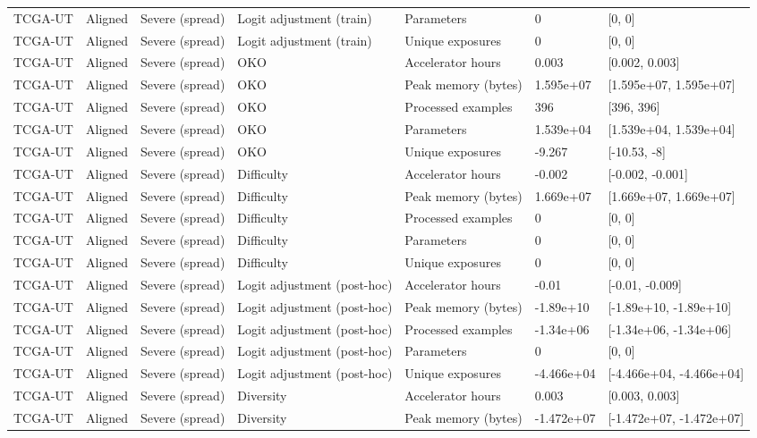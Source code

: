 \begin{longtable}{lllllll}
TCGA-UT & Aligned & Severe (spread) & Logit adjustment (train) & Parameters & 0 & [0, 0] \\
TCGA-UT & Aligned & Severe (spread) & Logit adjustment (train) & Unique exposures & 0 & [0, 0] \\
TCGA-UT & Aligned & Severe (spread) & OKO & Accelerator hours & 0.003 & [0.002, 0.003] \\
TCGA-UT & Aligned & Severe (spread) & OKO & Peak memory (bytes) & 1.595e+07 & [1.595e+07, 1.595e+07] \\
TCGA-UT & Aligned & Severe (spread) & OKO & Processed examples & 396 & [396, 396] \\
TCGA-UT & Aligned & Severe (spread) & OKO & Parameters & 1.539e+04 & [1.539e+04, 1.539e+04] \\
TCGA-UT & Aligned & Severe (spread) & OKO & Unique exposures & -9.267 & [-10.53, -8] \\
TCGA-UT & Aligned & Severe (spread) & Difficulty & Accelerator hours & -0.002 & [-0.002, -0.001] \\
TCGA-UT & Aligned & Severe (spread) & Difficulty & Peak memory (bytes) & 1.669e+07 & [1.669e+07, 1.669e+07] \\
TCGA-UT & Aligned & Severe (spread) & Difficulty & Processed examples & 0 & [0, 0] \\
TCGA-UT & Aligned & Severe (spread) & Difficulty & Parameters & 0 & [0, 0] \\
TCGA-UT & Aligned & Severe (spread) & Difficulty & Unique exposures & 0 & [0, 0] \\
TCGA-UT & Aligned & Severe (spread) & Logit adjustment (post-hoc) & Accelerator hours & -0.01 & [-0.01, -0.009] \\
TCGA-UT & Aligned & Severe (spread) & Logit adjustment (post-hoc) & Peak memory (bytes) & -1.89e+10 & [-1.89e+10, -1.89e+10] \\
TCGA-UT & Aligned & Severe (spread) & Logit adjustment (post-hoc) & Processed examples & -1.34e+06 & [-1.34e+06, -1.34e+06] \\
TCGA-UT & Aligned & Severe (spread) & Logit adjustment (post-hoc) & Parameters & 0 & [0, 0] \\
TCGA-UT & Aligned & Severe (spread) & Logit adjustment (post-hoc) & Unique exposures & -4.466e+04 & [-4.466e+04, -4.466e+04] \\
TCGA-UT & Aligned & Severe (spread) & Diversity & Accelerator hours & 0.003 & [0.003, 0.003] \\
TCGA-UT & Aligned & Severe (spread) & Diversity & Peak memory (bytes) & -1.472e+07 & [-1.472e+07, -1.472e+07] \\

\end{longtable}
